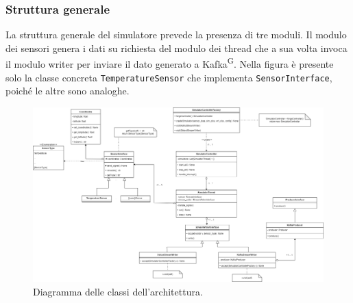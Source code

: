 \documentclass[8pt]{article}
\newcommand{\glossterm}[1]{#1\textsuperscript{G}} %
\begin{document}
\subsubsection{Struttura generale}
La struttura generale del simulatore prevede la presenza di tre moduli. Il modulo dei sensori genera i dati su richiesta del modulo dei thread che a sua volta invoca il modulo writer per inviare il dato generato a \glossterm{Kafka}.
Nella figura è presente solo la classe concreta \verb|TemperatureSensor| che implementa \verb|SensorInterface|, poiché le altre sono analoghe.
\begin{figure}[h!]
    \centering
    \includegraphics[width=1\textwidth]{images_st/overview.png}
    \caption{Diagramma delle classi dell'architettura.}
    \label{fig:Diagramma delle classi dell'architettura}
\end{figure}
\clearpage
\end{document}
